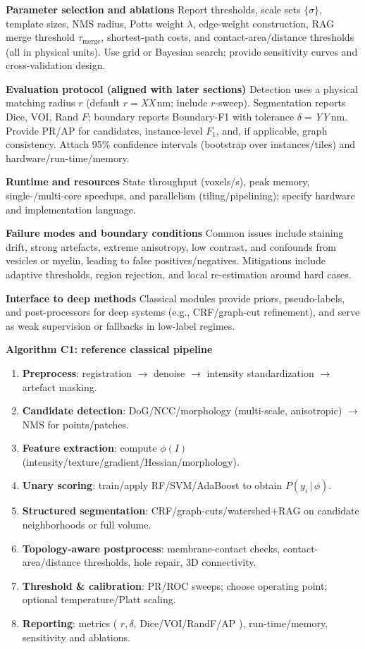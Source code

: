 \medskip
\noindent\textbf{Parameter selection and ablations}\;
Report thresholds, scale sets \(\{\sigma\}\), template sizes, NMS radius, Potts weight \(\lambda\), edge-weight construction, RAG merge threshold \(\tau_{\text{merge}}\), shortest-path costs, and contact-area/distance thresholds (all in physical units).
Use grid or Bayesian search; provide sensitivity curves and cross-validation design.

\medskip
\noindent\textbf{Evaluation protocol (aligned with later sections)}\;
Detection uses a physical matching radius \(r\) (default \(r=\)\textit{XX}\,nm; include \(r\)-sweep).
Segmentation reports Dice, VOI, Rand \(F\); boundary reports Boundary-F1 with tolerance \(\delta=\)\textit{YY}\,nm.
Provide PR/AP for candidates, instance-level \(F_1\), and, if applicable, graph consistency.
Attach 95\% confidence intervals (bootstrap over instances/tiles) and hardware/run-time/memory.

\medskip
\noindent\textbf{Runtime and resources}\;
State throughput (voxels/s), peak memory, single-/multi-core speedups, and parallelism (tiling/pipelining); specify hardware and implementation language.

\medskip
\noindent\textbf{Failure modes and boundary conditions}\;
Common issues include staining drift, strong artefacts, extreme anisotropy, low contrast, and confounds from vesicles or myelin, leading to false positives/negatives.
Mitigations include adaptive thresholds, region rejection, and local re-estimation around hard cases.

\medskip
\noindent\textbf{Interface to deep methods}\;
Classical modules provide priors, pseudo-labels, and post-processors for deep systems (e.g., CRF/graph-cut refinement), and serve as weak supervision or fallbacks in low-label regimes.

\medskip
\noindent\textbf{Algorithm C1: reference classical pipeline}\;
\begin{enumerate}
  \item \textbf{Preprocess}: registration \(\rightarrow\) denoise \(\rightarrow\) intensity standardization \(\rightarrow\) artefact masking.
  \item \textbf{Candidate detection}: DoG/NCC/morphology (multi-scale, anisotropic) \(\rightarrow\) NMS for points/patches.
  \item \textbf{Feature extraction}: compute \(\phi(I)\) (intensity/texture/gradient/Hessian/morphology).
  \item \textbf{Unary scoring}: train/apply RF/SVM/AdaBoost to obtain \(P(y_i\,|\,\phi)\).
  \item \textbf{Structured segmentation}: CRF/graph-cuts/watershed\(+\)RAG on candidate neighborhoods or full volume.
  \item \textbf{Topology-aware postprocess}: membrane-contact checks, contact-area/distance thresholds, hole repair, 3D connectivity.
  \item \textbf{Threshold \& calibration}: PR/ROC sweeps; choose operating point; optional temperature/Platt scaling.
  \item \textbf{Reporting}: metrics ( \(r,\delta\), Dice/VOI/RandF/AP ), run-time/memory, sensitivity and ablations.
\end{enumerate}

